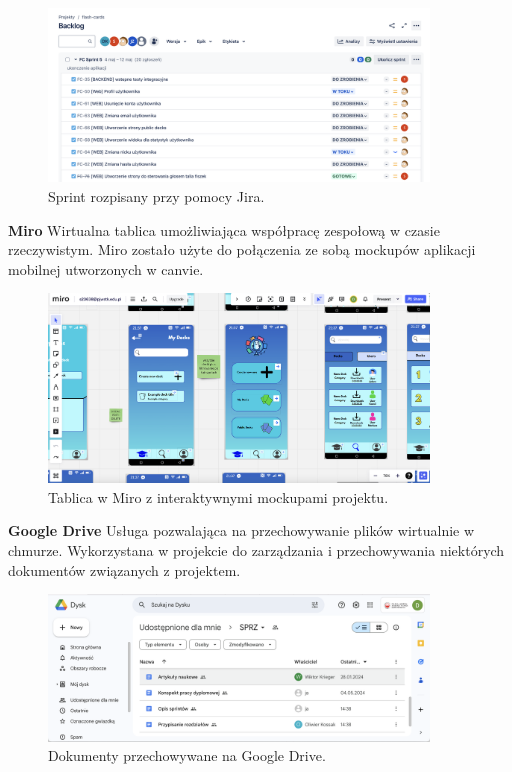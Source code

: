 \begin{figure}[H]
    \centering
    \includegraphics[width=0.9\textwidth]{chapters/chapter_7/jira.png}
    \caption{Sprint rozpisany przy pomocy Jira.}
    \label{img:jira}
\end{figure}


\textbf{Miro} Wirtualna tablica umożliwiająca współpracę zespołową w czasie rzeczywistym. Miro zostało użyte do połączenia ze sobą mockupów aplikacji mobilnej utworzonych w canvie.

\begin{figure}[H]
    \centering
    \includegraphics[width=0.9\textwidth]{chapters/chapter_7/miro.png}
    \caption{Tablica w Miro z interaktywnymi mockupami projektu.}
    \label{img:miro}
\end{figure}


\textbf{Google Drive} Usługa pozwalająca na przechowywanie plików wirtualnie w chmurze. Wykorzystana w projekcie do zarządzania i przechowywania niektórych dokumentów związanych z projektem.

\begin{figure}[H]
    \centering
    \includegraphics[width=0.9\textwidth]{chapters/chapter_7/google_drive.png}
    \caption{Dokumenty przechowywane na Google Drive.}
    \label{img:google_drive}
\end{figure}



